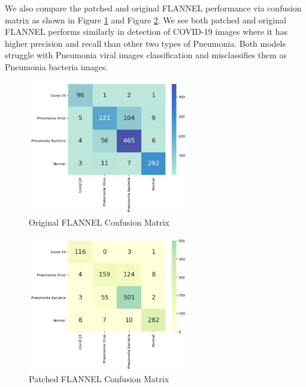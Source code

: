 \documentclass{sigkddExp}
\begin{document}

We also compare the patched and original FLANNEL performance via confusion
matrix as shown in Figure \ref{fig:f_cf} and Figure \ref{fig:p_cf}. We see both
patched and original FLANNEL performs similarly in detection of COVID-19 images
where it has higher precision and recall than other two types of Pneumonia. Both
models struggle with Pneumonia viral images classification and misclassifies
them as Pneumonia bacteria images.

\begin{figure}[h]
    \centering
    \includegraphics[width=7cm]{../doc/images/base_flannel_cf.png}
    \caption{Original FLANNEL Confusion Matrix}
    \label{fig:f_cf}
\end{figure}


\begin{figure}[h]
    \centering
    \includegraphics[width=7cm]{../doc/images/patched_flannel_cf.png}
    \caption{Patched FLANNEL Confusion Matrix}
    \label{fig:p_cf}
\end{figure}
\end{document}

